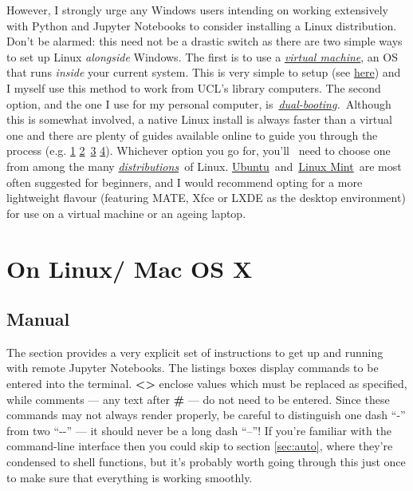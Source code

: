 \documentclass[a4paper]{article}
\begin{document}
However, I strongly urge any Windows users intending on working extensively with Python and Jupyter Notebooks to consider installing a Linux distribution.
Don't be alarmed: this need not be a drastic switch as there are two simple ways to set up Linux \emph{alongside} Windows.
The first is to use a \emph{\href{https://www.howtogeek.com/196060/beginner-geek-how-to-create-and-use-virtual-machines/}{virtual machine}}, an OS that runs \emph{inside} your current system.
This is very simple to setup (see \href{http://www.storagecraft.com/blog/the-dead-simple-guide-to-installing-a-linux-virtual-machine-on-windows/}{here}) and I myself use this method to work from UCL's library computers.
The second option, and the one I use for my personal computer, is~\emph{\href{https://www.howtogeek.com/187789/dual-booting-explained-how-you-can-have-multiple-operating-systems-on-your-computer/}{dual-booting}.}~Although this is somewhat involved, a native Linux install is always faster than a virtual one and there are plenty of guides available online to guide you through the process (e.g. \href{https://itsfoss.com/guide-install-linux-mint-16-dual-boot-windows/}{1} \href{https://www.lifewire.com/ultimate-windows-7-ubuntu-linux-dual-boot-guide-2200653}{2}~\href{https://www.howtogeek.com/214571/how-to-dual-boot-linux-on-your-pc/}{3} \href{http://www.pcworld.com/article/2955460/operating-systems/dual-booting-linux-with-windows-what-you-need-to-know.html}{4}). 
Whichever option you go for, you'll ~need to choose one from among the many \emph{\href{http://distrowatch.com/dwres.php?resource=major}{distributions}~}of Linux.
\href{https://www.ubuntu.com/download}{Ubuntu}~and~\href{https://linuxmint.com/}{Linux Mint}~are most often suggested for beginners, and I would recommend opting for a more lightweight flavour (featuring MATE, Xfce or LXDE as the desktop environment) for use on a virtual machine or an ageing laptop.

\section{On Linux/ Mac OS X}
\subsection{Manual}
\label{sec:manual}

The section provides a very explicit set of instructions to get up and running with remote Jupyter Notebooks.
The listings boxes display commands to be entered into the terminal. \textbf{\textless{}\textgreater{}} enclose values which must be replaced as specified, while comments --- any text after \textbf{\#} --- do not need to be entered.
Since these commands may not always render properly, be careful to distinguish one dash ``-'' from two ``-{}-'' --- it should never be a long dash ``--''!
If you're familiar with the command-line interface then you could skip to section \ref{sec:auto}, where they're condensed to shell functions, but it's probably worth going through this just once to make sure that everything is working smoothly.
\end{document}

